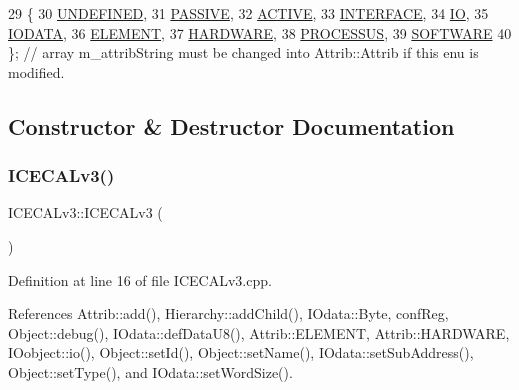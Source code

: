 \begin{DoxyCode}
29                 \{
30     \hyperlink{classAttrib_a69e171d7cc6417835a5a306d3c764235a3a8da2ab97dda18aebab196fe4100531}{UNDEFINED},
31     \hyperlink{classAttrib_a69e171d7cc6417835a5a306d3c764235a2bfb2af57b87031d190a05fe25dd92ed}{PASSIVE},
32     \hyperlink{classAttrib_a69e171d7cc6417835a5a306d3c764235a3b1fec929c0370d1436f2f06e298fb0d}{ACTIVE},
33     \hyperlink{classAttrib_a69e171d7cc6417835a5a306d3c764235aa27c16b480a369ea4d18b07b2516bbc7}{INTERFACE},
34     \hyperlink{classAttrib_a69e171d7cc6417835a5a306d3c764235a1420a5b8c0540b2af210b6975eded7f9}{IO},
35     \hyperlink{classAttrib_a69e171d7cc6417835a5a306d3c764235a0af3b0d0ac323c1704e6c69cf90add28}{IODATA},
36     \hyperlink{classAttrib_a69e171d7cc6417835a5a306d3c764235a7788bc5dd333fd8ce18562b269c9dab1}{ELEMENT},
37     \hyperlink{classAttrib_a69e171d7cc6417835a5a306d3c764235a61ceb22149f365f1780d18f9d1459423}{HARDWARE},
38     \hyperlink{classAttrib_a69e171d7cc6417835a5a306d3c764235a75250e29692496e73effca2c0330977f}{PROCESSUS},
39     \hyperlink{classAttrib_a69e171d7cc6417835a5a306d3c764235a103a67cd0b8f07ef478fa45d4356e27b}{SOFTWARE} 
40   \}; \textcolor{comment}{// array m\_attribString must be changed into Attrib::Attrib if this enu is modified. }
\end{DoxyCode}


\subsection{Constructor \& Destructor Documentation}
\mbox{\label{classICECALv3_a0a8b12d2b6bafca9cd820301fc93dff8}} 
\subsubsection{\texorpdfstring{I\+C\+E\+C\+A\+Lv3()}{ICECALv3()}}
{\footnotesize\ttfamily I\+C\+E\+C\+A\+Lv3\+::\+I\+C\+E\+C\+A\+Lv3 (\begin{DoxyParamCaption}{ }\end{DoxyParamCaption})}



Definition at line 16 of file I\+C\+E\+C\+A\+Lv3.\+cpp.



References Attrib\+::add(), Hierarchy\+::add\+Child(), I\+Odata\+::\+Byte, conf\+Reg, Object\+::debug(), I\+Odata\+::def\+Data\+U8(), Attrib\+::\+E\+L\+E\+M\+E\+NT, Attrib\+::\+H\+A\+R\+D\+W\+A\+RE, I\+Oobject\+::io(), Object\+::set\+Id(), Object\+::set\+Name(), I\+Odata\+::set\+Sub\+Address(), Object\+::set\+Type(), and I\+Odata\+::set\+Word\+Size().


